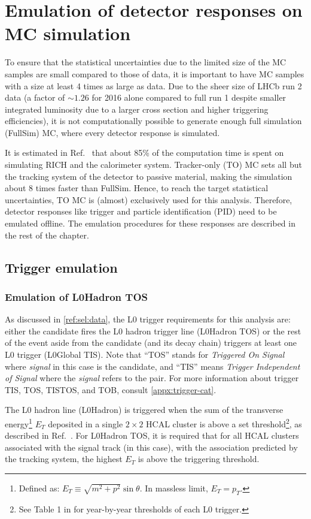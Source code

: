 \chapter{Emulation of detector responses on MC simulation}
\label{ref:mc-emulation}

To ensure that the statistical uncertainties due to the limited size of the  MC
samples are small compared to those of data,
it is important to have MC samples with a size at least 4 times as large as
data.
Due to the sheer size of LHCb run 2 data
(a factor of $\sim\!1.26$ for 2016 alone compared to full run 1 despite smaller
integrated luminosity due to a larger \bbbar cross section and higher triggering
efficiencies),
it is not computationally possible to generate
enough full simulation (FullSim) MC, where every detector response is simulated.

It is estimated in Ref.~\cite{LHCb-INT-2019-025}
that about 85\% of the computation time is spent on simulating RICH and the
calorimeter system.
Tracker-only (TO) MC sets all but the tracking system of the detector to
passive material, making the simulation about 8 times faster than FullSim.
Hence, to reach the target statistical uncertainties,
TO MC is (almost) exclusively used for this analysis.
Therefore, detector responses like trigger and particle identification (PID)
need to be emulated offline.
The emulation procedures for these responses are described in the rest of the
chapter.


\section{Trigger emulation}
\subsection{Emulation of L0Hadron TOS}

As discussed in \cref{ref:sel:data},
the L0 trigger requirements for this analysis are:
either the \Dz candidate fires the L0 hadron trigger line
(\Dz L0Hadron TOS)
or the rest of the event aside from the \Dz\muon candidate (and its decay chain)
triggers at least one L0 trigger (\B L0Global TIS).
Note that ``TOS'' stands for \emph{Triggered On Signal} where
\emph{signal} in this case is the \Dz candidate,
and ``TIS'' means \emph{Trigger Independent of Signal} where the \emph{signal}
refers to the \Dz\muon pair.
For more information about trigger TIS, TOS, TISTOS, and TOB,
consult \cref{appx:trigger-cat}.

The L0 hadron line (L0Hadron) is triggered when the sum of the transverse
energy\footnote{
    Defined as: $E_T \equiv \sqrt{m^2 + p^2} \sin\theta$.
    In massless limit, $E_T = p_T$.
} $E_T$ deposited
in a single $2 \times 2$ HCAL cluster is above a set threshold\footnote{
    See Table 1 in \cite{LHCb-DP-2019-001} for year-by-year thresholds of each
    L0 trigger.
},
as described in Ref.~\cite{LHCb-DP-2019-001}.
For L0Hadron TOS, it is required that for all HCAL clusters associated with the
signal track (\Dz in this case),
with the association predicted by the tracking system,
the highest $E_T$ is above the triggering threshold.

